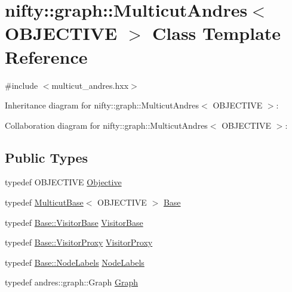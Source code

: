\hypertarget{classnifty_1_1graph_1_1MulticutAndres}{}\section{nifty\+:\+:graph\+:\+:Multicut\+Andres$<$ O\+B\+J\+E\+C\+T\+I\+V\+E $>$ Class Template Reference}
\label{classnifty_1_1graph_1_1MulticutAndres}


{\ttfamily \#include $<$multicut\+\_\+andres.\+hxx$>$}



Inheritance diagram for nifty\+:\+:graph\+:\+:Multicut\+Andres$<$ O\+B\+J\+E\+C\+T\+I\+V\+E $>$\+:


Collaboration diagram for nifty\+:\+:graph\+:\+:Multicut\+Andres$<$ O\+B\+J\+E\+C\+T\+I\+V\+E $>$\+:
\subsection*{Public Types}
\begin{DoxyCompactItemize}
\item 
typedef O\+B\+J\+E\+C\+T\+I\+V\+E \hyperlink{classnifty_1_1graph_1_1MulticutAndres_af65f82c6d6f78356d08de6728618fc02}{Objective}
\item 
typedef \hyperlink{classnifty_1_1graph_1_1MulticutBase}{Multicut\+Base}$<$ O\+B\+J\+E\+C\+T\+I\+V\+E $>$ \hyperlink{classnifty_1_1graph_1_1MulticutAndres_a69c11222fd83a2839aad9a67ced87c87}{Base}
\item 
typedef \hyperlink{classnifty_1_1graph_1_1MulticutBase_a5882fb69df59d8113f6a81a0dac26eaa}{Base\+::\+Visitor\+Base} \hyperlink{classnifty_1_1graph_1_1MulticutAndres_ac07b28fb84cb2202147dd666d5d19c25}{Visitor\+Base}
\item 
typedef \hyperlink{classnifty_1_1graph_1_1MulticutBase_a6ede271a3cb0ae4711a7e9da2b07efa9}{Base\+::\+Visitor\+Proxy} \hyperlink{classnifty_1_1graph_1_1MulticutAndres_ad56184f36c01591fbb5d99da132c2833}{Visitor\+Proxy}
\item 
typedef \hyperlink{classnifty_1_1graph_1_1MulticutBase_afba61ad2919d0fad20b3745af19309da}{Base\+::\+Node\+Labels} \hyperlink{classnifty_1_1graph_1_1MulticutAndres_a0948881682fa859a4f2b985e0a95b2c7}{Node\+Labels}
\item 
typedef andres\+::graph\+::\+Graph \hyperlink{classnifty_1_1graph_1_1MulticutAndres_ac0ad695f55ab8ac75ab5f8be6f513652}{Graph}
\end{DoxyCompactItemize}
